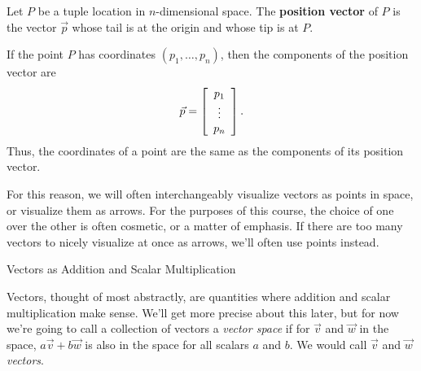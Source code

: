 \documentclass{ximera}
\begin{document}
\begin{definition}\label{def:posvec}

    Let $P$ be a tuple location in $n$-dimensional space. The \textbf{position
      vector}%
     of $P$ is the vector
    $\vec{p}$ whose tail is at the origin and whose tip
    is at $P$.
    \begin{center}
    \end{center}
    If the point $P$ has coordinates $(p_1,\ldots,p_n)$, then the
    components of the position vector are
    \begin{equation*}
      \vec{p} =
      \startmat{c}
        p_1    \\
        \vdots \\
        p_n
      \stopmat.
    \end{equation*}
    Thus, the coordinates of a point are the same as the components of
    its position vector. 
    
    \begin{remark}
    
    For this reason, we will often interchangeably visualize vectors as points in space, or visualize them as arrows. For the purposes of this course, the choice of one over the other is often cosmetic, or a matter of emphasis. If there are too many vectors to nicely visualize at once as arrows, we'll often use points instead.

  \end{remark}
  \end{definition}

\begin{definition}{Vectors as Addition and Scalar Multiplication}\label{def:vecasaddmult}

    Vectors, thought of most abstractly, are quantities where addition and scalar multiplication make sense. We'll get more precise about this later, but for now we're going to call a collection of vectors a \textit{vector space} if for $\vec{v}$ and $\vec{w}$ in the space, $a\vec{v}+b\vec{w}$ is also in the space for all scalars $a$ and $b$. We would call $\vec{v}$ and $\vec{w}$ \textit{vectors}.

\end{definition}
\end{document}
